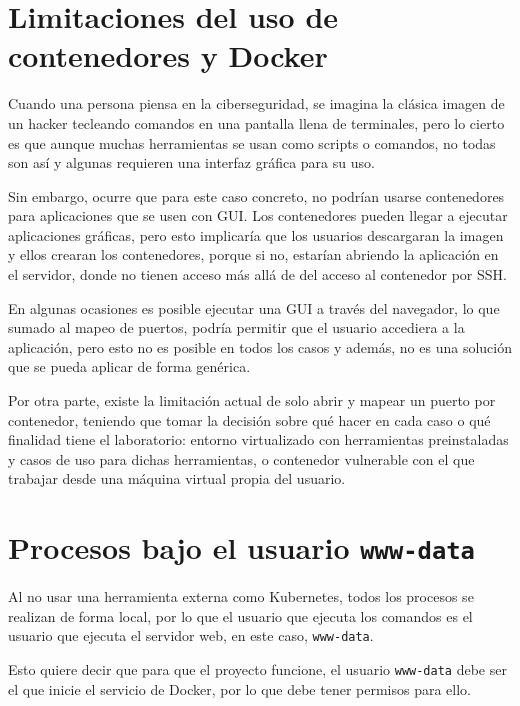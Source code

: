    \section{Limitaciones del uso de contenedores y Docker}
        
        Cuando una persona piensa en la ciberseguridad, se imagina la clásica imagen de un hacker tecleando comandos en una pantalla llena de terminales, pero lo cierto es que aunque muchas herramientas se usan como scripts o comandos, no todas son así y algunas requieren una interfaz gráfica para su uso.

        Sin embargo, ocurre que para este caso concreto, no podrían usarse contenedores para aplicaciones que se usen con GUI. Los contenedores pueden llegar a ejecutar aplicaciones gráficas, pero esto implicaría que los usuarios descargaran la imagen y ellos crearan los contenedores, porque si no, estarían abriendo la aplicación en el servidor, donde no tienen acceso más allá de del acceso al contenedor por SSH.

        En algunas ocasiones es posible ejecutar una GUI a través del navegador, lo que sumado al mapeo de puertos, podría permitir que el usuario accediera a la aplicación, pero esto no es posible en todos los casos y además, no es una solución que se pueda aplicar de forma genérica.
        
        Por otra parte, existe la limitación actual de solo abrir y mapear un puerto por contenedor, teniendo que tomar la decisión sobre qué hacer en cada caso o qué finalidad tiene el laboratorio: entorno virtualizado con herramientas preinstaladas y casos de uso para dichas herramientas, o contenedor vulnerable con el que trabajar desde una máquina virtual propia del usuario.


    \section{Procesos bajo el usuario \texttt{www-data}}

        Al no usar una herramienta externa como Kubernetes, todos los procesos se realizan de forma local, por lo que el usuario que ejecuta los comandos es el usuario que ejecuta el servidor web, en este caso, \texttt{www-data}.

        Esto quiere decir que para que el proyecto funcione, el usuario \texttt{www-data} debe ser el que inicie el servicio de Docker, por lo que debe tener permisos para ello.

